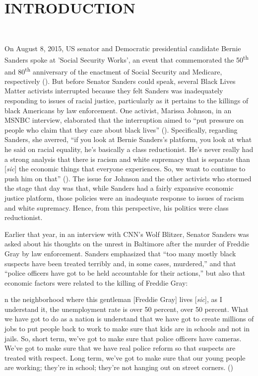 \documentclass[12pt]{article}
\renewenvironment{quote}
  {\list{}{\leftmargin=\parindent\rightmargin=0pt}%
   \item\relax}
  {\endlist}
\begin{document}

\section{INTRODUCTION} \

On August 8, 2015, US senator and Democratic presidential candidate Bernie Sanders spoke at 'Social Security Works', an event that commemorated the 50\textsuperscript{th} and 80\textsuperscript{th} anniversary of the enactment of Social Security and Medicare, respectively (\cite{wilsonProtestersShutBernie2015}). But before Senator Sanders could speak, several Black Lives Matter activists interrupted because they felt Sanders was inadequately responding to issues of racial justice, particularly as it pertains to the killings of black Americans by law enforcement. One activist, Marissa Johnson, in an MSNBC interview, elaborated that the interruption aimed to “put pressure on people who claim that they care about black lives” (\cite{hallBernieSandersBlack2015}). Specifically, regarding Sanders, she averred, “if you look at Bernie Sanders’s platform, you look at what he said on racial equality, he’s basically a class reductionist. He’s never really had a strong analysis that there is racism and white supremacy that is separate than [\textit{sic}] the economic things that everyone experiences. So, we want to continue to push him on that” (\cite{hallBernieSandersBlack2015}). The issue for Johnson and the other activists who stormed the stage that day was that, while Sanders had a fairly expansive economic justice platform, those policies were an inadequate response to issues of racism and white supremacy. Hence, from this perspective, his politics were class reductionist.

Earlier that year, in an interview with CNN’s Wolf Blitzer, Senator Sanders was asked about his thoughts on the unrest in Baltimore after the murder of Freddie Gray by law enforcement. Sanders emphasized that “too many mostly black suspects have been treated terribly and, in some cases, murdered,” and that “police officers have got to be held accountable for their actions,” but also that economic factors were related to the killing of Freddie Gray:

\begin{quote}
[I]n the neighborhood where this gentleman [Freddie Gray] lives [\textit{sic}], as I understand it, the unemployment rate is over 50 percent, over 50 percent. What we have got to do as a nation is understand that we have got to create millions of jobs to put people back to work to make sure that kids are in schools and not in jails. So, short term, we've got to make sure that police officers have cameras. We've got to make sure that we have real police reform so that suspects are treated with respect. Long term, we've got to make sure that our young people are working; they're in school; they're not hanging out on street corners. (\cite{sandersInterviewWolfBlitzer2015})
\end{quote}
\end{document}
